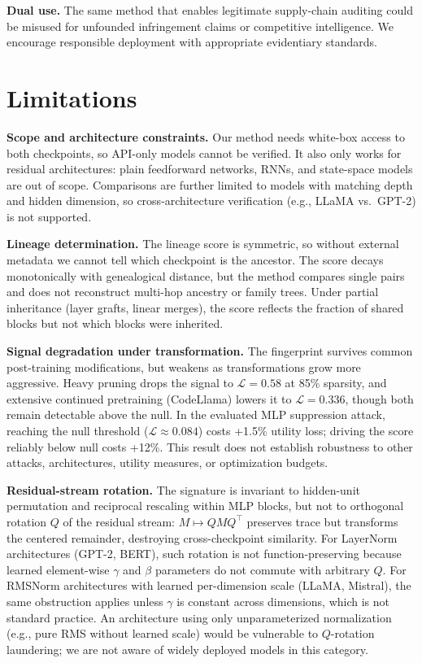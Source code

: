 \textbf{Dual use.} The same method that enables legitimate supply-chain auditing could be misused for unfounded infringement claims or competitive intelligence. We encourage responsible deployment with appropriate evidentiary standards.

\section*{Limitations}\label{sec:limitations}

\textbf{Scope and architecture constraints.} Our method needs white-box access to both checkpoints, so API-only models cannot be verified. It also only works for residual architectures: plain feedforward networks, RNNs, and state-space models are out of scope. Comparisons are further limited to models with matching depth and hidden dimension, so cross-architecture verification (e.g., LLaMA vs.\ GPT-2) is not supported.

\textbf{Lineage determination.} The lineage score is symmetric, so without external metadata we cannot tell which checkpoint is the ancestor. The score decays monotonically with genealogical distance, but the method compares single pairs and does not reconstruct multi-hop ancestry or family trees. Under partial inheritance (layer grafts, linear merges), the score reflects the fraction of shared blocks but not which blocks were inherited.

\textbf{Signal degradation under transformation.} The fingerprint survives common post-training modifications, but weakens as transformations grow more aggressive. Heavy pruning drops the signal to $\mathcal{L}=0.58$ at 85\% sparsity, and extensive continued pretraining (CodeLlama) lowers it to $\mathcal{L}=0.336$, though both remain detectable above the null. In the evaluated MLP suppression attack, reaching the null threshold ($\mathcal{L} \approx 0.084$) costs +1.5\% utility loss; driving the score reliably below null costs +12\%. This result does not establish robustness to other attacks, architectures, utility measures, or optimization budgets.

\textbf{Residual-stream rotation.} The signature is invariant to hidden-unit permutation and reciprocal rescaling within MLP blocks, but not to orthogonal rotation $Q$ of the residual stream: $M \mapsto QMQ^\top$ preserves trace but transforms the centered remainder, destroying cross-checkpoint similarity. For LayerNorm architectures (GPT-2, BERT), such rotation is not function-preserving because learned element-wise $\gamma$ and $\beta$ parameters do not commute with arbitrary $Q$. For RMSNorm architectures with learned per-dimension scale (LLaMA, Mistral), the same obstruction applies unless $\gamma$ is constant across dimensions, which is not standard practice. An architecture using only unparameterized normalization (e.g., pure RMS without learned scale) would be vulnerable to $Q$-rotation laundering; we are not aware of widely deployed models in this category.

